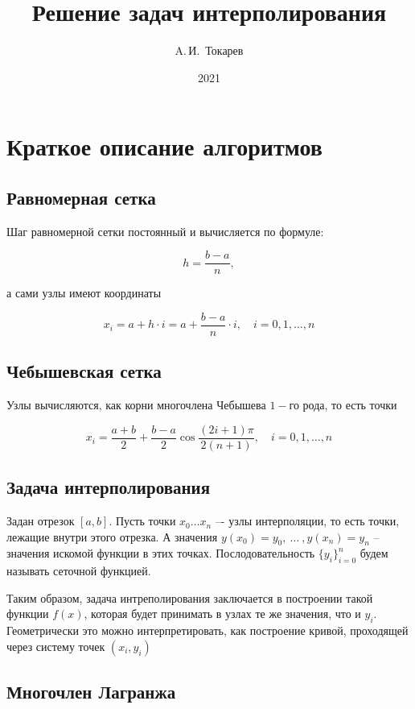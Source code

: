 \documentclass[12pt, a4paper]{article}
\title{Решение задач интерполирования}
\author{A.\,И.~Токарев}
\date{2021}
\begin{document}
\maketitle
\tableofcontents 
\newpage

\section{Краткое описание алгоритмов}

\subsection{Равномерная сетка}

Шаг равномерной сетки постоянный и вычисляется по формуле: 

\[
    h = \dfrac{b - a}{n},  
\]

\noindent а сами узлы имеют координаты 

\[
    x_i = a + h \cdot i = a + \dfrac{b - a}{n} \cdot i, \quad i = 0,1,\ldots,n
\]

\subsection{Чебышевская сетка}

Узлы вычисляются, как корни многочлена Чебышева $1-$го рода, то есть точки 

\[
    x_i = \dfrac{a + b}{2} + \dfrac{b - a}{2} \cos \dfrac{(2i + 1) \pi }{2 (n + 1)}, \quad i = 0,1,\ldots,n
\]

\subsection{Задача интерполирования}

Задан отрезок $[a, b]$. Пусть точки $x_0 \ldots x_n$ –- узлы интерполяции, то есть точки, лежащие внутри этого отрезка. А значения $y(x_0) = y_0,\  \ldots \  ,y(x_n) = y_n$ -- значения искомой функции в этих точках. Послодовательность $\{y_i\}_{i=0}^n$ будем называть сеточной функцией. 

Таким образом, задача интреполирования заключается в построении такой функции $ f(x) $, которая будет принимать в узлах те же значения, что и $ y_i $. Геометрически это можно интерпретировать, как построение кривой, проходящей через систему точек $ (x_i, y_i) $

\subsection{Многочлен Лагранжа}
\end{document}
